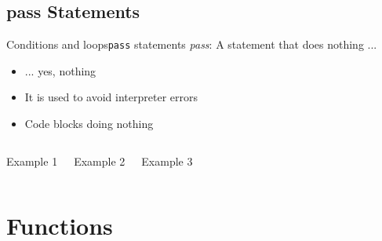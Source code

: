 \documentclass[10pt,compress]{beamer} %
\begin{document}
\subsection{pass Statements}
\begin{frame}{Conditions and loops}{\texttt{pass} statements}
	\textit{pass}: A statement that does nothing ...
		\begin{itemize}
		\item ... yes, nothing
		\item It is used to avoid interpreter errors
		\item Code blocks doing nothing
		\end{itemize}
    \begin{columns}
		\begin{block}{Example 1}
		\vspace{-0.2cm}
		
		\vspace{-0.2cm}
		\end{block}

		\begin{block}{Example 2}
		\vspace{-0.2cm}
		
		\vspace{-0.2cm}
		\end{block}

		\begin{block}{Example 3}
		\vspace{-0.2cm}
		
		\vspace{-0.2cm}
		\end{block}
	\end{columns}
\end{frame}

\section{Functions}
\end{document}
